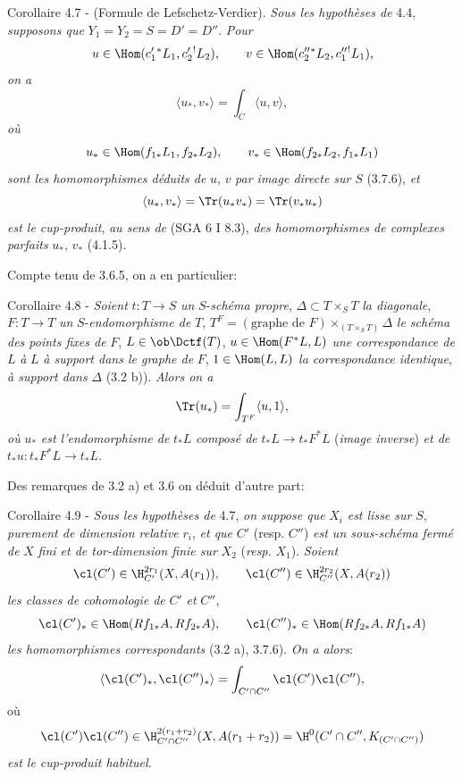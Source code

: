 \begin{statement}{Corollaire 4.7 - (Formule de Lefschetz-Verdier).}
\emph{Sous les hypothèses de} 4.4, \emph{supposons que} $Y_1=Y_2=S=D'=D''$. \emph{Pour}
\[
u\in\Hom(c_1'{}^*L_1,c_2'{}^!L_2),\qquad
v\in\Hom(c_2''{}^*L_2,c_1''{}^!L_1),
\]
\emph{on a}
\begin{equation}
\tag{4.7.1}
\langle u_*,v_*\rangle=\int_C\langle u,v\rangle,
\end{equation}
\emph{où}
\[
u_*\in\Hom(f_{1*}L_1,f_{2*}L_2),\qquad
v_*\in\Hom(f_{2*}L_2,f_{1*}L_1)
\]
\emph{sont les homomorphismes déduits de} $u$, $v$ \emph{par image directe sur} $S$ (3.7.6), \emph{et}
\[
\langle u_*,v_*\rangle=\Tr(u_*v_*)=\Tr(v_*u_*)
\]
\emph{est le cup-produit}, \emph{au sens de} (SGA 6 I 8.3), \emph{des homomorphismes de complexes parfaits} $u_*$, $v_*$ (4.1.5).
\end{statement}

Compte tenu de 3.6.5, on a en particulier:

\begin{statement}{Corollaire 4.8 -}
\emph{Soient} $t:T\longrightarrow S$ \emph{un} $S$-\emph{schéma propre}, $\Delta\subset T\times_S T$ \emph{la diagonale}, $F:T\longrightarrow T$ \emph{un} $S$-\emph{endomorphisme de} $T$, $T^F=(\text{graphe de }F)\times_{(T\times_S T)}\Delta$ \emph{le schéma des points fixes de} $F$, $L\in\ob\Dctf(T)$, $u\in\Hom(F^*L,L)$ \emph{une correspondance de} $L$ \emph{à} $L$ \emph{à support dans le graphe de} $F$, $1\in\Hom(L,L)$ \emph{la correspondance identique}, \emph{à support dans} $\Delta$ (3.2 b)). \emph{Alors on a}
\[
\Tr(u_*)=\int_{T^F}\langle u,1\rangle,
\]
\emph{où} $u_*$ \emph{est l'endomorphisme de} $t_*L$ \emph{composé de} $t_*L\longrightarrow t_*F^*L$ (\emph{image inverse}) \emph{et de} $t_*u:t_*F^*L\longrightarrow t_*L$.
\end{statement}

Des remarques de 3.2 a) et 3.6 on déduit d'autre part:

\begin{statement}{Corollaire 4.9 -}
\emph{Sous les hypothèses de} 4.7, \emph{on suppose que} $X_i$ \emph{est lisse sur} $S$, \emph{purement de dimension relative} $r_i$, \emph{et que} $C'$ (resp. $C''$) \emph{est un sous-schéma}
\emph{fermé de} $X$ \emph{fini et de tor-dimension finie sur} $X_2$ (\emph{resp.} $X_1$). \emph{Soient}
\[
\cl(C')\in \H_{C'}^{2r_1}(X,A(r_1)),\qquad
\cl(C'')\in \H_{C''}^{2r_2}(X,A(r_2))
\]
\emph{les classes de cohomologie de} $C'$ \emph{et} $C''$,
\[
\cl(C')_*\in\Hom(Rf_{1*}A,Rf_{2*}A),\qquad
\cl(C'')_*\in\Hom(Rf_{2*}A,Rf_{1*}A)
\]
\emph{les homomorphismes correspondants} (3.2 a), 3.7.6). \emph{On a alors}:
\[
\langle \cl(C')_*,\cl(C'')_*\rangle
=
\int_{C'\cap C''}\cl(C')\cl(C''),
\]
où
\[
\cl(C')\cl(C'')\in
\H_{C'\cap C''}^{2(r_1+r_2)}(X,A(r_1+r_2))
=
\H^0(C'\cap C'',K_{(C'\cap C'')})
\]
\emph{est le cup-produit habituel}.
\end{statement}

